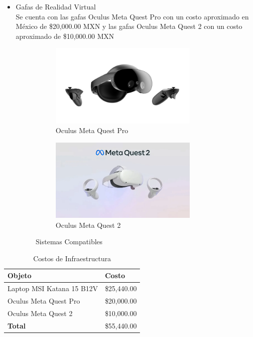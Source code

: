 \begin{itemize}
    \item Gafas de Realidad Virtual\\
    Se cuenta con las gafas Oculus Meta Quest Pro con un costo aproximado en México de \$20,000.00 MXN y las gafas Oculus Meta Quest 2 con un costo aproximado de \$10,000.00 MXN\\
    \begin{figure}[thbp]
        \centering
        \begin{subfigure}[b]{0.45\linewidth}
            \includegraphics[width=\linewidth, height = 4cm]{img/chapter03/Meta_Quest_Pro.png}
            \caption{Oculus Meta Quest Pro}
            \label{fig:Oculus_Meta_Quest_Pro}
        \end{subfigure}
        \begin{subfigure}[b]{0.45\linewidth}
            \includegraphics[width=\linewidth, height = 4cm]{img/chapter03/Meta_Quest_2.png}
            \caption{Oculus Meta Quest 2}
            \label{fig:Oculus_Meta_Quest_2}
        \end{subfigure}
        \caption{Sistemas Compatibles}
    \end{figure}
\end{itemize}

\begin{table}[H]
  \centering
  \begin{tabular}{|>{\centering\arraybackslash}m{}|>{\centering\arraybackslash}m{}|}
    \hline
    \rowcolor{blue_escom}
     \textbf{Objeto} & \textbf{Costo} \\
     \hline
     Laptop MSI Katana 15 B12V & \$25,440.00\\
     Oculus Meta Quest Pro & \$20,000.00\\
     Oculus Meta Quest 2 & \$10,000.00\\
     \hline
     \rowcolor{column_color}
     \textbf{Total} & \$55,440.00\\
     \hline
  \end{tabular}
  \caption{Costos de Infraestructura}
  \label{tab:Costos}
\end{table}

